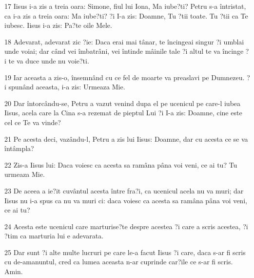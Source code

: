 \par 17 Iisus i-a zis a treia oara: Simone, fiul lui Iona, Ma iube?ti? Petru s-a întristat, ca i-a zis a treia oara: Ma iube?ti? ?i I-a zis: Doamne, Tu ?tii toate. Tu ?tii ca Te iubesc. Iisus i-a zis: Pa?te oile Mele.
\par 18 Adevarat, adevarat zic ?ie: Daca erai mai tânar, te încingeai singur ?i umblai unde voiai; dar când vei îmbatrâni, vei întinde mâinile tale ?i altul te va încinge ?i te va duce unde nu voie?ti.
\par 19 Iar aceasta a zis-o, însemnând cu ce fel de moarte va preaslavi pe Dumnezeu. ?i spunând aceasta, i-a zis: Urmeaza Mie.
\par 20 Dar întorcându-se, Petru a vazut venind dupa el pe ucenicul pe care-l iubea Iisus, acela care la Cina s-a rezemat de pieptul Lui ?i I-a zis: Doamne, cine este cel ce Te va vinde?
\par 21 Pe acesta deci, vazându-l, Petru a zis lui Iisus: Doamne, dar cu acesta ce se va întâmpla?
\par 22 Zis-a Iisus lui: Daca voiesc ca acesta sa ramâna pâna voi veni, ce ai tu? Tu urmeaza Mie.
\par 23 De aceea a ie?it cuvântul acesta între fra?i, ca ucenicul acela nu va muri; dar Iisus nu i-a spus ca nu va muri ci: daca voiesc ca acesta sa ramâna pâna voi veni, ce ai tu?
\par 24 Acesta este ucenicul care marturise?te despre acestea ?i care a scris acestea, ?i ?tim ca marturia lui e adevarata.
\par 25 Dar sunt ?i alte multe lucruri pe care le-a facut Iisus ?i care, daca s-ar fi scris cu de-amanuntul, cred ca lumea aceasta n-ar cuprinde car?ile ce s-ar fi scris. Amin.


